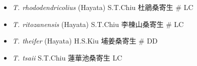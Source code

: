 \begin{itemize}
\begin{itemize}
        \item[] \textit{T. rhododendricolius} (Hayata) S.T.Chiu  杜鵑桑寄生  \# LC
        \item[] \textit{T. ritozanensis} (Hayata) S.T.Chiu  李棟山桑寄生  \# LC
        \item[] \textit{T. theifer} (Hayata) H.S.Kiu  埔姜桑寄生  \# DD
        \item[] \textit{T. tsaii} S.T.Chiu  蓮華池桑寄生   LC
  \end{itemize}
  \end{itemize}
